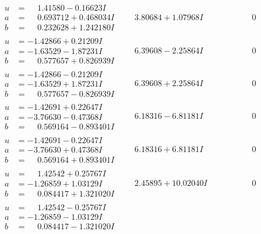 \documentclass[1p]{elsarticle_modified}
\theoremstyle{definition}
\begin{document}
$$\begin{array}{c|c|c}
\begin{aligned}
u &= \phantom{-}1.41580 - 0.16623 I \\
a &= \phantom{-}0.693712 + 0.468034 I \\
b &= \phantom{-}0.232628 + 1.242180 I\end{aligned}
 & \phantom{-}3.80684 + 1.07968 I & \phantom{-0.000000 } 0 \\ \hline\begin{aligned}
u &= -1.42866 + 0.21209 I \\
a &= -1.63529 - 1.87231 I \\
b &= \phantom{-}0.577657 + 0.826939 I\end{aligned}
 & \phantom{-}6.39608 - 2.25864 I & \phantom{-0.000000 } 0 \\ \hline\begin{aligned}
u &= -1.42866 - 0.21209 I \\
a &= -1.63529 + 1.87231 I \\
b &= \phantom{-}0.577657 - 0.826939 I\end{aligned}
 & \phantom{-}6.39608 + 2.25864 I & \phantom{-0.000000 } 0 \\ \hline\begin{aligned}
u &= -1.42691 + 0.22647 I \\
a &= -3.76630 - 0.47368 I \\
b &= \phantom{-}0.569164 - 0.893401 I\end{aligned}
 & \phantom{-}6.18316 - 6.81181 I & \phantom{-0.000000 } 0 \\ \hline\begin{aligned}
u &= -1.42691 - 0.22647 I \\
a &= -3.76630 + 0.47368 I \\
b &= \phantom{-}0.569164 + 0.893401 I\end{aligned}
 & \phantom{-}6.18316 + 6.81181 I & \phantom{-0.000000 } 0 \\ \hline\begin{aligned}
u &= \phantom{-}1.42542 + 0.25767 I \\
a &= -1.26859 + 1.03129 I \\
b &= \phantom{-}0.084417 + 1.321020 I\end{aligned}
 & \phantom{-}2.45895 + 10.02040 I & \phantom{-0.000000 } 0 \\ \hline\begin{aligned}
u &= \phantom{-}1.42542 - 0.25767 I \\
a &= -1.26859 - 1.03129 I \\
b &= \phantom{-}0.084417 - 1.321020 I\end{aligned}

\end{array}$$
\end{document}
